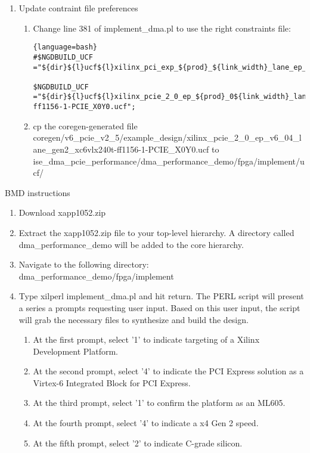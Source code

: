 \begin{enumerate}
\item Update contraint file preferences
\begin{enumerate}
\item Change line 381 of implement\_dma.pl to use the right constraints file:
\begin{lstlisting}{language=bash}
#$NGDBUILD_UCF ="${dir}${l}ucf${l}xilinx_pci_exp_${prod}_${link_width}_lane_ep_${board}${gen_speed}.ucf";

$NGDBUILD_UCF ="${dir}${l}ucf${l}xilinx_pcie_2_0_ep_${prod}_0${link_width}_lane_${gen_speed}_xc6vlx240t-ff1156-1-PCIE_X0Y0.ucf";
\end{lstlisting}

\item cp the coregen-generated file coregen/v6\_pcie\_v2\_5/example\_design/xilinx\_pcie\_2\_0\_ep\_v6\_04\_lane\_gen2\_xc6vlx240t-ff1156-1-PCIE\_X0Y0.ucf to
  ise\_dma\_pcie\_performance/dma\_performance\_demo/fpga/implement/ucf/

\end{enumerate}
\end{enumerate}
BMD instructions
\begin{enumerate}

\item Download xapp1052.zip
\item Extract the xapp1052.zip file to your top-level hierarchy. A directory called dma\_performance\_demo will be added to the core hierarchy.
\item Navigate to the following directory:
 dma\_performance\_demo/fpga/implement
\item Type xilperl implement\_dma.pl and hit return.
 The PERL script will present a series a prompts requesting user input. Based on this user input, the script will grab the necessary files to synthesize and build the design.
\begin{enumerate}
\item At the first prompt, select '1' to indicate targeting of a Xilinx Development Platform.
\item At the second prompt, select '4' to indicate the PCI Express solution as a Virtex-6 Integrated Block for PCI Express.
\item At the third prompt, select '1' to confirm the platform as an ML605.
\item At the fourth prompt, select '4' to indicate a x4 Gen 2 speed.
\item At the fifth prompt, select '2' to indicate C-grade silicon.

\end{enumerate}

\end{enumerate}
